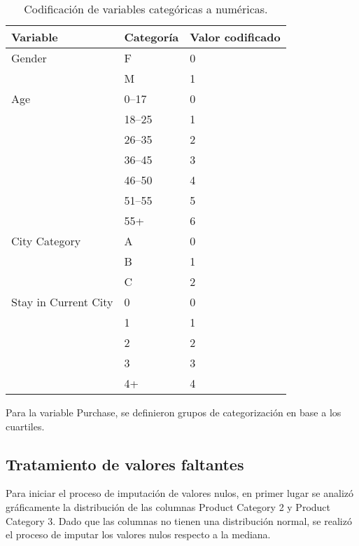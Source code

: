 \documentclass[12pt]{article}
\begin{document}
\begin{table}[ht]
    \centering
    \caption{Codificación de variables categóricas a numéricas.}
    \begin{tabular}{l l l}
        \toprule
        \textbf{Variable} & \textbf{Categoría} & \textbf{Valor codificado} \\
        \midrule
        Gender & F & 0 \\
               & M & 1 \\
        \midrule
        Age & 0--17 & 0 \\
            & 18--25 & 1 \\
            & 26--35 & 2 \\
            & 36--45 & 3 \\
            & 46--50 & 4 \\
            & 51--55 & 5 \\
            & 55+ & 6 \\
        \midrule
        City Category & A & 0 \\
                     & B & 1 \\
                     & C & 2 \\
        \midrule
        Stay in Current City & 0 & 0 \\
                             & 1 & 1 \\
                             & 2 & 2 \\
                             & 3 & 3 \\
                             & 4+ & 4 \\
        \bottomrule
    \end{tabular}
    \label{tab:codificacion}
\end{table}


Para la variable Purchase, se definieron grupos de categorización en base a
los cuartiles.

\subsection{Tratamiento de valores faltantes}

Para iniciar el proceso de imputación de valores nulos, en primer lugar se analizó gráficamente la distribución de las columnas Product Category 2 y Product Category 3. Dado que las columnas no tienen una distribución normal, se realizó
el proceso de imputar los valores nulos respecto a la mediana.
\end{document}
